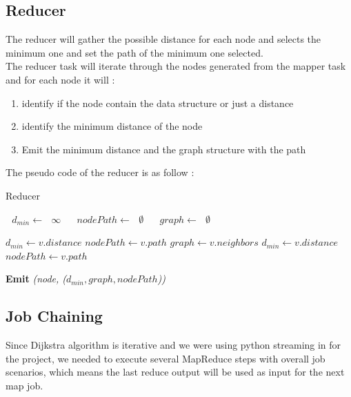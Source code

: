 \documentclass[english]{article}
\begin{document}
\subsection{Reducer}
The reducer will gather the possible distance for each node and selects the minimum one and set the path of the minimum one selected.\\

The reducer task will iterate through the nodes generated from the mapper task and for each node it will :
\begin{enumerate}
\item identify if the node contain the data structure or just a distance
\item identify the minimum distance of the node
\item Emit the minimum distance and the graph structure with the path
\end{enumerate}

The pseudo code of the reducer is as follow : 
\begin{algorithm}[h]
\caption{Reducer}\label{reducer}
\begin{algorithmic}[1]
\State $ \textit{ $d_{min}$} \gets \textit{ $\infty$ } $
\State $ \textit{ $nodePath     $} \gets \textit{ $\emptyset$ } $
\State $ \textit{ $graph     $} \gets \textit{ $\emptyset$ }$

	\State $ d_{min} \gets  v.distance  $
	\State $ nodePath \gets v.path $
	\State $ graph \gets  v.neighbors $
\Else{}
		\State $ d_{min} \gets  v.distance $
		\State $ nodePath \gets v.path $
	\EndIf
\EndIf

\State \textbf{ Emit} \emph{(node, ($d_{min}, graph, nodePath$))}

\EndProcedure
\end{algorithmic}
\end{algorithm}




\subsection{Job Chaining}
Since Dijkstra algorithm is iterative and we were using python streaming in for the project, we needed to execute several MapReduce steps with overall job scenarios, which means the last reduce output will be used as input for the next map job.\\
\end{document}
